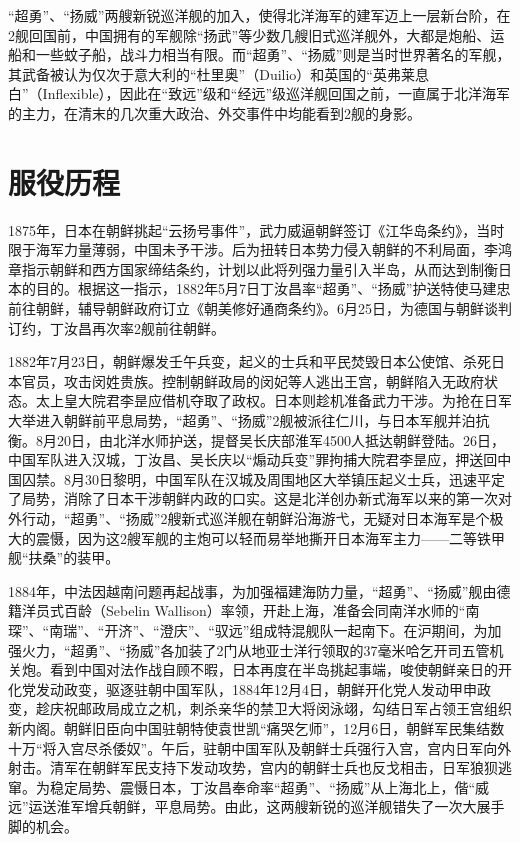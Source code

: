 \documentclass[12pt,UTF8]{ctexbook}
\begin{document}
“超勇”、“扬威”两艘新锐巡洋舰的加入，使得北洋海军的建军迈上一层新台阶，在2舰回国前，中国拥有的军舰除“扬武”等少数几艘旧式巡洋舰外，大都是炮船、运船和一些蚊子船，战斗力相当有限。而“超勇”、“扬威”则是当时世界著名的军舰，其武备被认为仅次于意大利的“杜里奥”（Duilio）和英国的“英弗莱息白”（Inflexible），因此在“致远”级和“经远”级巡洋舰回国之前，一直属于北洋海军的主力，在清末的几次重大政治、外交事件中均能看到2舰的身影。

\section{服役历程}

1875年，日本在朝鲜挑起“云扬号事件”，武力威逼朝鲜签订《江华岛条约》，当时限于海军力量薄弱，中国未予干涉。后为扭转日本势力侵入朝鲜的不利局面，李鸿章指示朝鲜和西方国家缔结条约，计划以此将列强力量引入半岛，从而达到制衡日本的目的。根据这一指示，1882年5月7日丁汝昌率“超勇”、“扬威”护送特使马建忠前往朝鲜，辅导朝鲜政府订立《朝美修好通商条约》。6月25日，为德国与朝鲜谈判订约，丁汝昌再次率2舰前往朝鲜。

1882年7月23日，朝鲜爆发壬午兵变，起义的士兵和平民焚毁日本公使馆、杀死日本官员，攻击闵姓贵族。控制朝鲜政局的闵妃等人逃出王宫，朝鲜陷入无政府状态。太上皇大院君李昰应借机夺取了政权。日本则趁机准备武力干涉。为抢在日军大举进入朝鲜前平息局势，“超勇”、“扬威”2舰被派往仁川，与日本军舰并泊抗衡。8月20日，由北洋水师护送，提督吴长庆部淮军4500人抵达朝鲜登陆。26日，中国军队进入汉城，丁汝昌、吴长庆以“煽动兵变”罪拘捕大院君李昰应，押送回中国囚禁。8月30日黎明，中国军队在汉城及周围地区大举镇压起义士兵，迅速平定了局势，消除了日本干涉朝鲜内政的口实。这是北洋创办新式海军以来的第一次对外行动，“超勇”、“扬威”2艘新式巡洋舰在朝鲜沿海游弋，无疑对日本海军是个极大的震慑，因为这2艘军舰的主炮可以轻而易举地撕开日本海军主力——二等铁甲舰“扶桑”的装甲。

1884年，中法因越南问题再起战事，为加强福建海防力量，“超勇”、“扬威”舰由德籍洋员式百龄（Sebelin Wallison）率领，开赴上海，准备会同南洋水师的“南琛”、“南瑞”、“开济”、“澄庆”、“驭远”组成特混舰队一起南下。在沪期间，为加强火力，“超勇”、“扬威”各加装了2门从地亚士洋行领取的37毫米哈乞开司五管机关炮。看到中国对法作战自顾不暇，日本再度在半岛挑起事端，唆使朝鲜亲日的开化党发动政变，驱逐驻朝中国军队，1884年12月4日，朝鲜开化党人发动甲申政变，趁庆祝邮政局成立之机，刺杀亲华的禁卫大将闵泳翊，勾结日军占领王宫组织新内阁。朝鲜旧臣向中国驻朝特使袁世凯“痛哭乞师”，12月6日，朝鲜军民集结数十万“将入宫尽杀倭奴”。午后，驻朝中国军队及朝鲜士兵强行入宫，宫内日军向外射击。清军在朝鲜军民支持下发动攻势，宫内的朝鲜士兵也反戈相击，日军狼狈逃窜。为稳定局势、震慑日本，丁汝昌奉命率“超勇”、“扬威”从上海北上，偕“威远”运送淮军增兵朝鲜，平息局势。由此，这两艘新锐的巡洋舰错失了一次大展手脚的机会。
\end{document}
